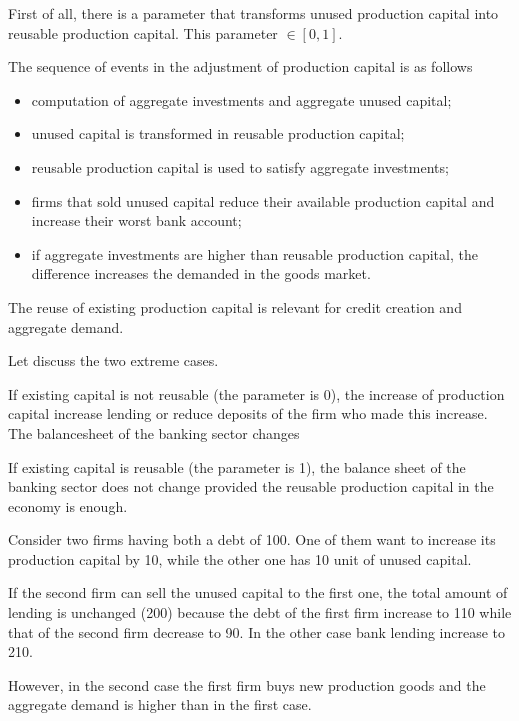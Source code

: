 \documentclass{article}
\begin{document}
First of all, there is a parameter that transforms unused production capital into reusable production capital.
This parameter $\in[0,1]$.

The sequence of events in the adjustment of production capital is as follows
\begin{itemize}
	\item computation of aggregate investments and aggregate unused capital;
	\item unused capital is transformed in reusable production capital;
	\item reusable production capital is used to satisfy aggregate investments;
	\item firms that sold unused capital reduce their available production capital and increase their worst bank account;
	\item if aggregate investments are higher than reusable production capital, the difference increases the demanded in the goods market. 
\end{itemize}

The reuse of existing production capital is relevant for credit creation and aggregate demand.

Let discuss the two extreme cases.

If existing capital is not reusable (the parameter is 0), the increase of production capital increase lending or reduce deposits of the firm who made this increase. The balancesheet of the banking sector changes

If existing capital is reusable (the parameter is 1), the balance sheet of the banking sector does not change provided the reusable production capital in the economy is enough.

Consider two firms having both a debt of 100. One of them want to increase its production capital by 10, while the other one has 10 unit of unused capital. 

If the second firm can sell the unused capital to the first one, the total amount of lending is unchanged (200) because the debt of the first firm increase to 110 while that of the second firm decrease to 90.
In the other case bank lending increase to 210.

However, in the second case the first firm buys new production goods and the aggregate demand is higher than in the first case. 
\end{document}
